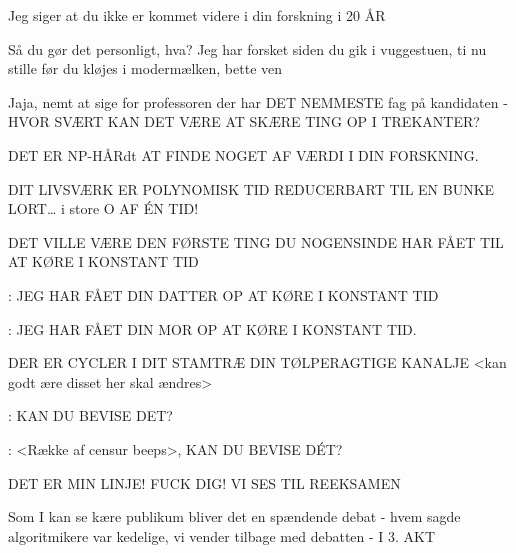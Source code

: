 \documentclass[a4paper,11pt]{article}
\begin{document}
\begin{sketch}
 Jeg siger at du ikke er kommet videre i din forskning i 20 ÅR


 Så du gør det personligt, hva? Jeg har forsket siden du gik i vuggestuen, ti nu stille før du kløjes i modermælken, bette ven

 Jaja, nemt at sige for professoren der har DET NEMMESTE fag på kandidaten - HVOR SVÆRT KAN DET VÆRE AT SKÆRE TING OP I TREKANTER?


 DET ER NP-HÅRdt AT FINDE NOGET AF VÆRDI I DIN FORSKNING.

 DIT LIVSVÆRK ER POLYNOMISK TID REDUCERBART TIL EN BUNKE LORT… i store O AF ÉN TID!


 DET VILLE VÆRE DEN FØRSTE TING DU NOGENSINDE HAR FÅET TIL AT KØRE I KONSTANT TID

: JEG HAR FÅET DIN DATTER OP AT KØRE I KONSTANT TID

: JEG HAR FÅET DIN MOR OP AT KØRE I KONSTANT TID. 

 DER ER CYCLER I DIT STAMTRÆ DIN TØLPERAGTIGE KANALJE   <kan godt ære disset her skal ændres>

: KAN DU BEVISE DET? 

: <Række af censur beeps>, KAN DU BEVISE DÉT?

 DET ER MIN LINJE! FUCK DIG! VI SES TIL REEKSAMEN


 Som I kan se kære publikum bliver det en spændende debat - hvem sagde algoritmikere var kedelige, vi vender tilbage med debatten - I 3. AKT



\end{sketch}
\end{document}
